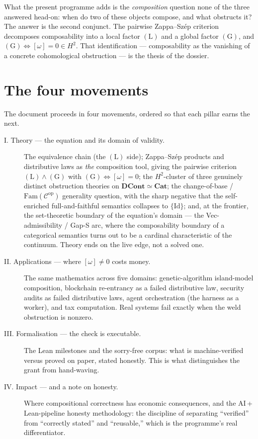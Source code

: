 \documentclass[11pt]{report}
\theoremstyle{plain}
\theoremstyle{definition}
\theoremstyle{remark}
\newcommand{\DCont}{\mathbf{DCont}}
\newcommand{\Cat}{\mathbf{Cat}}
\newcommand{\Fam}{\mathrm{Fam}}
\newcommand{\Hcoh}{H^2}
\begin{document}
What the present programme adds is the \emph{composition} question none of the
three answered head-on: when do two of these objects compose, and what
obstructs it? The answer is the second conjunct. The pairwise Zappa--Sz\'ep
criterion decomposes composability into a local factor $(\mathrm{L})$ and a
global factor $(\mathrm{G})$, and $(\mathrm{G})\Leftrightarrow[\omega]=0\in
\Hcoh$. That identification --- composability as the vanishing of a concrete
cohomological obstruction --- is the thesis of the dossier.

\section{The four movements}

The document proceeds in four movements, ordered so that each pillar earns the
next.

\begin{description}
\item[I. Theory --- the equation and its domain of validity.]
The equivalence chain (the $(\mathrm{L})$ side); Zappa--Sz\'ep products and
distributive laws as \emph{the} composition tool, giving the pairwise criterion
$(\mathrm{L})\wedge(\mathrm{G})$ with $(\mathrm{G})\Leftrightarrow[\omega]=0$;
the $\Hcoh$-cluster of three genuinely distinct obstruction theories on
$\DCont\simeq\Cat$; the change-of-base / $\Fam(\mathcal{C}^{\mathrm{op}})$
generality question, with the sharp negative that the self-enriched
full-and-faithful semantics collapses to $\{\mathrm{Id}\}$; and, at the
frontier, the set-theoretic boundary of the equation's domain --- the
Vec-admissibility / Gap-S arc, where the composability boundary of a categorical
semantics turns out to be a cardinal characteristic of the continuum. Theory
ends on the live edge, not a solved one.

\item[{II. Applications --- where $[\omega]\neq 0$ costs money.}]
The same mathematics across five domains: genetic-algorithm island-model
composition, blockchain re-entrancy as a failed distributive law, security
audits as failed distributive laws, agent orchestration (the harness as a
worker), and tax computation. Real systems fail exactly when the weld
obstruction is nonzero.

\item[III. Formalisation --- the check is executable.]
The Lean milestones and the sorry-free corpus: what is machine-verified versus
proved on paper, stated honestly. This is what distinguishes the grant from
hand-waving.

\item[IV. Impact --- and a note on honesty.]
Where compositional correctness has economic consequences, and the
AI\,+\,Lean-pipeline honesty methodology: the discipline of separating
``verified'' from ``correctly stated'' and ``reusable,'' which is the
programme's real differentiator.
\end{description}
\end{document}
